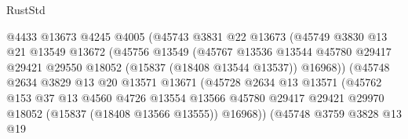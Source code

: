 \begin{lexlean}{RustStd}
\begin{coremodule}
{\begin{coremodule}
{{{{{{{{{{{{{{{{{{{{{{{{{{{{{{{{{{{{{{{{{{{{{{{{{{{{{{{{{{{{                                @4433
                                @13673
                                @4245
                                @4005
                                (@45743
                                  @3831
                                  @22
                                  @13673
                                  (@45749
                                    @3830
                                    @13
                                    @21
                                    @13549
                                    @13672
                                    (@45756
                                      @13549
                                      (@45767
                                        @13536
                                        @13544
                                        @45780
                                        @29417
                                        @29421
                                        @29550
                                        @18052
                                        (@15837 (@18408 @13544 @13537))
                                        @16968))
                                    (@45748
                                      @2634
                                      @3829
                                      @13
                                      @20
                                      @13571
                                      @13671
                                      (@45728
                                        @2634
                                        @13
                                        @13571
                                        (@45762
                                          @153
                                          @37
                                          @13
                                          @4560
                                          @4726
                                          @13554
                                          @13566
                                          @45780
                                          @29417
                                          @29421
                                          @29970
                                          @18052
                                          (@15837 (@18408 @13566 @13555))
                                          @16968))
                                      (@45748
                                        @3759
                                        @3828
                                        @13
                                        @19
}}}}}}}}}}}}}}}}}}}}}}}}}}}}}}}}}}}}}}}}}}}}}}}}}}}}}}}}}}}}
\end{coremodule}}
\end{coremodule}
\end{lexlean}
